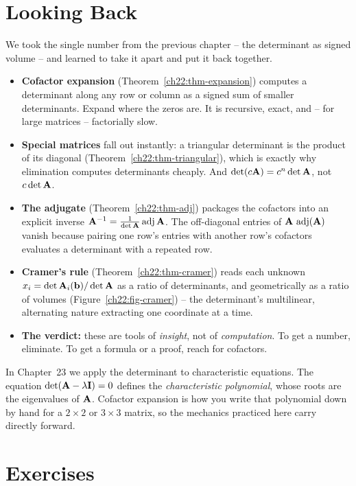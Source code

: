 \section{Looking Back}

We took the single number from the previous chapter -- the determinant as signed volume -- and learned
to take it apart and put it back together.

\begin{itemize}
\item \textbf{Cofactor expansion} (Theorem~\ref{ch22:thm-expansion}) computes a determinant along any
  row or column as a signed sum of smaller determinants. Expand where the zeros are. It is recursive,
  exact, and -- for large matrices -- factorially slow.
\item \textbf{Special matrices} fall out instantly: a triangular determinant is the product of its
  diagonal (Theorem~\ref{ch22:thm-triangular}), which is exactly why elimination computes determinants
  cheaply. And $\det(c\mathbf{A})=c^n\det\mathbf{A}$, not $c\det\mathbf{A}$.
\item \textbf{The adjugate} (Theorem~\ref{ch22:thm-adj}) packages the cofactors into an explicit
  inverse $\mathbf{A}^{-1}=\frac{1}{\det\mathbf{A}}\operatorname{adj}\mathbf{A}$. The off-diagonal entries of
  $\mathbf{A}\,\operatorname{adj}(\mathbf{A})$ vanish
  because pairing one row's entries with another row's cofactors evaluates a determinant with
  a repeated row.
\item \textbf{Cramer's rule} (Theorem~\ref{ch22:thm-cramer}) reads each unknown
  $x_i=\det\mathbf{A}_i(\mathbf{b})/\det\mathbf{A}$ as a ratio of determinants, and geometrically as a ratio of
  volumes (Figure~\ref{ch22:fig-cramer}) -- the determinant's multilinear, alternating nature
  extracting one coordinate at a time.
\item \textbf{The verdict:} these are tools of \emph{insight}, not of \emph{computation}. To
  get a number, eliminate. To get a formula or a proof, reach for cofactors.
\end{itemize}

In Chapter~23 we apply the determinant to characteristic equations. The equation
$\det(\mathbf{A}-\lambda\mathbf{I})=0$ defines the \emph{characteristic polynomial}, whose roots are
the eigenvalues of $\mathbf{A}$. Cofactor expansion is how you write that polynomial down by hand for
a $2\times2$ or $3\times3$ matrix, so the mechanics practiced here carry directly forward.

\section{Exercises}

